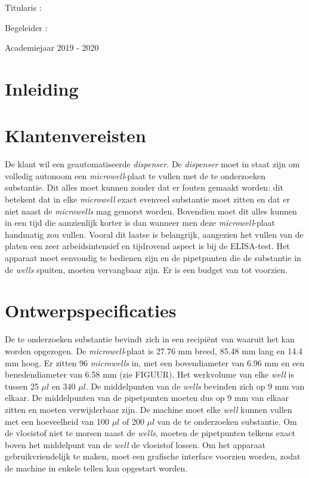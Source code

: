 \documentclass{article}
\begin{document}
\vspace{2cm}
{\Large Titularis : %
\vspace{1cm}

{\Large Begeleider : %


\vspace{1cm}

\begin{center}
	{\Large Academiejaar 2019 - 2020}
\end{center}

\section*{Inleiding}


\section{Klantenvereisten}
De klant wil een geautomatiseerde \textit{dispenser}. De \textit{dispenser} moet in staat zijn om volledig autonoom een \textit{microwell}-plaat te vullen met de te onderzoeken substantie. Dit alles moet kunnen zonder dat er fouten gemaakt worden: dit betekent dat in elke \textit{microwell} exact evenveel substantie moet zitten en dat er niet naast de \textit{microwells} mag gemorst worden. Bovendien moet dit alles kunnen in een tijd die aanzienlijk korter is dan wanneer men deze \textit{microwell}-plaat handmatig zou vullen. Vooral dit laatse is belangrijk, aangezien het vullen van de platen een zeer arbeidsintensief en tijdrovend aspect is bij de ELISA-test. Het apparaat moet eenvoudig te bedienen zijn en de pipetpunten die de substantie in de \textit{wells} spuiten, moeten vervangbaar zijn. Er is een budget van  tot  voorzien. 



\section{Ontwerpspecificaties}
De te onderzoeken substantie bevindt zich in een recipiënt van waaruit het kan worden opgezogen. De \textit{microwell}-plaat is 27.76 mm breed, 85.48 mm lang en 14.4 mm hoog. Er zitten 96 \textit{microwells} in, met een bovendiameter van 6.96 mm en een benedendiameter van 6.58 mm (zie FIGUUR). Het werkvolume van elke \textit{well} is tussen 25 $\mu l$ en 340 $\mu l$. De middelpunten van de \textit{wells} bevinden zich op 9 mm van elkaar. De middelpunten van de pipetpunten moeten dus op 9 mm van elkaar zitten en moeten verwijderbaar zijn. De machine moet elke \textit{well} kunnen vullen met een hoeveelheid van 100 $\mu l$ of 200 $\mu l$ van de te onderzoeken substantie. Om de vloeistof niet te morsen naast de \textit{wells}, moeten de pipetpunten telkens exact boven het middelpunt van de \textit{well} de vloeistof lossen. Om het apparaat gebruikvriendelijk te maken, moet een grafische interface voorzien worden, zodat de machine in enkele tellen kan opgestart worden. 

}}
\end{document}
